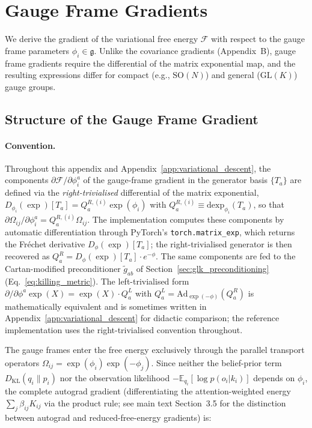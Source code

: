 \documentclass[twoside,11pt]{article}
\begin{document}
\section{Gauge Frame Gradients}
\label{app:phi_gradients}

We derive the gradient of the variational free energy $\mathcal{F}$ with respect to the gauge frame parameters $\phi_i \in \mathfrak{g}$. Unlike the covariance gradients (Appendix~B), gauge frame gradients require the differential of the matrix exponential map, and the resulting expressions differ for compact (e.g., $\mathrm{SO}(N)$) and general ($\mathrm{GL}(K)$) gauge groups.

\subsection{Structure of the Gauge Frame Gradient}

\paragraph{Convention.} Throughout this appendix and Appendix~\ref{app:variational_descent}, the components $\partial \mathcal{F}/\partial \phi_i^a$ of the gauge-frame gradient in the generator basis $\{T_a\}$ are defined via the \emph{right-trivialised} differential of the matrix exponential, $D_{\phi_i}(\exp)[T_a] = Q_a^{R,(i)} \exp(\phi_i)$ with $Q_a^{R,(i)} \equiv \mathrm{dexp}_{\phi_i}(T_a)$, so that $\partial \Omega_{ij}/\partial \phi_i^a = Q_a^{R,(i)} \Omega_{ij}$. The implementation computes these components by automatic differentiation through PyTorch's \texttt{torch.matrix\_exp}, which returns the Fr\'echet derivative $D_\phi(\exp)[T_a]$; the right-trivialised generator is then recovered as $Q_a^R = D_\phi(\exp)[T_a]\cdot e^{-\phi}$. The same components are fed to the Cartan-modified preconditioner $\tilde g_{ab}$ of Section~\ref{sec:glk_preconditioning} (Eq.~\ref{eq:killing_metric}). The left-trivialised form $\partial/\partial\phi^a \exp(X) = \exp(X)\cdot Q_a^L$ with $Q_a^L = \mathrm{Ad}_{\exp(-\phi)}(Q_a^R)$ is mathematically equivalent and is sometimes written in Appendix~\ref{app:variational_descent} for didactic comparison; the reference implementation uses the right-trivialised convention throughout.

The gauge frames enter the free energy exclusively through the parallel transport operators $\Omega_{ij} = \exp(\phi_i)\exp(-\phi_j)$. Since neither the belief-prior term $D_{\mathrm{KL}}(q_i \| p_i)$ nor the observation likelihood $-\mathbb{E}_{q_i}[\log p(o_i | k_i)]$ depends on $\phi_i$, the complete autograd gradient (differentiating the attention-weighted energy $\sum_j \beta_{ij} K_{ij}$ via the product rule; see main text Section~3.5 for the distinction between autograd and reduced-free-energy gradients) is:
\end{document}

